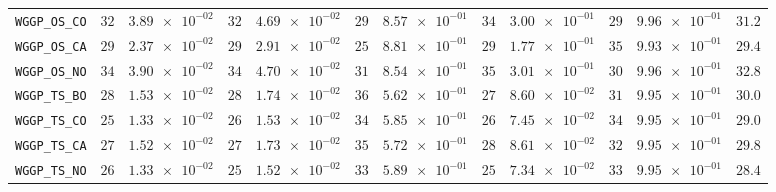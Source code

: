 \begin{table}[H]
\begin{tabularx}{\textwidth}{l||cC|cC|cC|cC|cC||c}
		\texttt{WGGP\_OS\_CO} & $ 32$ & $ \num{3.89e-02}$ & $ 32$ & $ \num{4.69e-02}$ & $ 29$ & $ \num{8.57e-01}$ & $ 34$ & $ \num{3.00e-01}$ & $ 29$ & $ \num{9.96e-01}$ & $ 31.2$  \\
		\texttt{WGGP\_OS\_CA} & $ 29$ & $ \num{2.37e-02}$ & $ 29$ & $ \num{2.91e-02}$ & $ 25$ & $ \num{8.81e-01}$ & $ 29$ & $ \num{1.77e-01}$ & $ 35$ & $ \num{9.93e-01}$ & $ 29.4$  \\
		\texttt{WGGP\_OS\_NO} & $ 34$ & $ \num{3.90e-02}$ & $ 34$ & $ \num{4.70e-02}$ & $ 31$ & $ \num{8.54e-01}$ & $ 35$ & $ \num{3.01e-01}$ & $ 30$ & $ \num{9.96e-01}$ & $ 32.8$  \\
		\texttt{WGGP\_TS\_BO} & $ 28$ & $ \num{1.53e-02}$ & $ 28$ & $ \num{1.74e-02}$ & $ 36$ & $ \num{5.62e-01}$ & $ 27$ & $ \num{8.60e-02}$ & $ 31$ & $ \num{9.95e-01}$ & $ 30.0$  \\
		\texttt{WGGP\_TS\_CO} & $ 25$ & $ \num{1.33e-02}$ & $ 26$ & $ \num{1.53e-02}$ & $ 34$ & $ \num{5.85e-01}$ & $ 26$ & $ \num{7.45e-02}$ & $ 34$ & $ \num{9.95e-01}$ & $ 29.0$  \\
		\texttt{WGGP\_TS\_CA} & $ 27$ & $ \num{1.52e-02}$ & $ 27$ & $ \num{1.73e-02}$ & $ 35$ & $ \num{5.72e-01}$ & $ 28$ & $ \num{8.61e-02}$ & $ 32$ & $ \num{9.95e-01}$ & $ 29.8$  \\
		\texttt{WGGP\_TS\_NO} & $ 26$ & $ \num{1.33e-02}$ & $ 25$ & $ \num{1.52e-02}$ & $ 33$ & $ \num{5.89e-01}$ & $ 25$ & $ \num{7.34e-02}$ & $ 33$ & $ \num{9.95e-01}$ & $ 28.4$  \\
	\end{tabularx}
\end{table}
